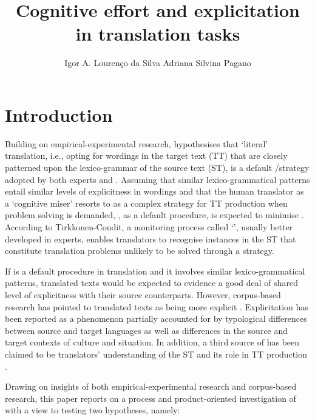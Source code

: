 \documentclass[output=paper]{LSP/langsci}
\title{Cognitive effort and explicitation in translation tasks}
\author{Igor A. Lourenço da Silva\affiliation{Universidade Federal de Uberlandia}%
\lastand Adriana Silvina Pagano\affiliation{Universidade Federal de Minas Gerais}
}
\begin{document}
\section{Introduction}

Building on empirical-experimental research, \citet{TirkkonenCondit2005} hypothesises that `literal' translation, i.e., opting for wordings in the target text (TT) that are closely patterned upon the lexico-grammar of the source text (ST), is a default /strategy adopted by both experts and . Assuming that similar lexico-grammatical patterns entail similar levels of explicitness in wordings \citet{Steiner2001Translations} and that the human translator as a `cognitive miser' \citep{Fiske1984} resorts to  as a complex strategy for TT production when problem solving is demanded, , as a default procedure, is expected to minimise . According to Tirkkonen-Condit, a monitoring process called `', usually better developed in experts, enables translators to recognise instances in the ST that constitute translation problems unlikely to be solved through a  strategy.

If  is a default procedure in translation and it involves similar lexico-grammatical patterns, translated texts would be expected to evidence a good deal of shared level of explicitness with their source counterparts. However, corpus-based research has pointed to translated texts as being more explicit %
%
%
%
\citep{Olohan2000, Steiner2001Intralingual, Steiner2001Translations}. Explicitation has been reported as a phenomenon partially accounted for by typological differences between source and target languages as well as differences in the source and target contexts of culture and situation. In addition, a third source of  has been claimed to be translators' understanding of the ST and its role in TT production \citep{Steiner2001Intralingual, Steiner2001Translations}. 

Drawing on insights of both empirical-experimental research and corpus-based research, this paper reports on a process and product-oriented investigation of  with a view to testing two hypotheses, namely: 
\end{document}
